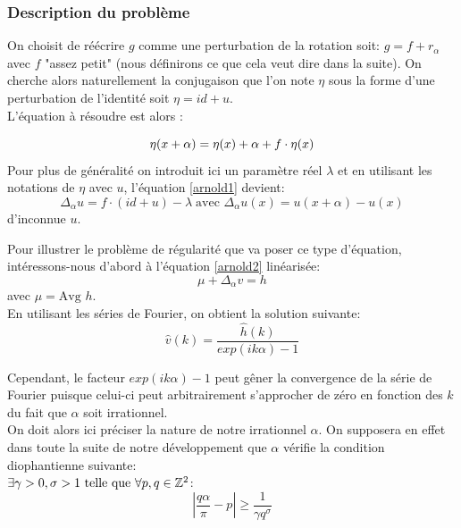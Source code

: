 \documentclass[11pt,a4paper]{article}
\begin{document}
\subsubsection{Description du problème}
On choisit de réécrire $g$ comme une perturbation de la rotation soit: $g= f + r_\alpha$ avec $f$ "assez petit" (nous définirons ce que cela veut dire dans la suite). On cherche alors naturellement la conjugaison que l'on note $\eta$ sous la forme d'une perturbation de l'identité soit $\eta=id+u$. \\
L'équation à résoudre est alors :

\begin{equation}\label{arnold1}
\eta(x + \alpha)= \eta(x) + \alpha + f \cdot \eta(x) \\
\end{equation}
Pour plus de généralité on introduit ici un paramètre réel $\lambda$ et en utilisant les notations de $\eta$ avec $u$, l'équation \eqref{arnold1} devient:
\begin{equation}\label{arnold2}
\Delta_\alpha u= f \cdot (id +u) - \lambda \; \text{avec  } \Delta_\alpha u(x)= u(x+\alpha) - u(x)
\end{equation}
d'inconnue $u$.
\par Pour illustrer le problème de régularité que va poser ce type d'équation, intéressons-nous d'abord à l'équation \eqref{arnold2} linéarisée:
\begin{equation}\label{arnold3}
\mu + \Delta_\alpha v = h 
\end{equation}
avec $\mu= \text{Avg } h$. \\
En utilisant les séries de Fourier, on obtient la solution suivante:
\begin{equation*}
\hat{v}(k)=\frac{\hat{h}(k)}{exp(ik \alpha) - 1}
\end{equation*}

Cependant, le facteur $exp(ik \alpha) - 1$ peut gêner la convergence de la série de Fourier puisque celui-ci peut arbitrairement s'approcher de zéro en fonction des $k$ du fait que $\alpha$ soit irrationnel. \\
On doit alors ici préciser la nature de notre irrationnel $\alpha$. On supposera en effet dans toute la suite de notre développement que $\alpha$ vérifie la condition diophantienne suivante: \\
 $ \exists \gamma>0,\sigma>1 \ \text{telle que} \ \forall p,q \in \mathbb Z^2 $:
\begin{equation}
|\frac{q \alpha}{\pi}-p|\geq \frac{1}{\gamma q^\sigma}
\end{equation} 
\end{document}
